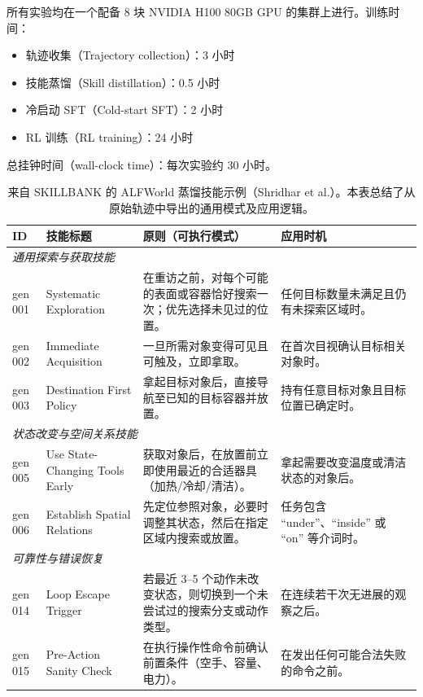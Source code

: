 \documentclass[11pt,UTF8,fontset=fandol]{ctexart}
\begin{document}
所有实验均在一个配备 8 块 NVIDIA H100 80GB GPU 的集群上进行。训练时间：
\begin{itemize}[leftmargin=2em]
\item 轨迹收集（Trajectory collection）：3 小时
\item 技能蒸馏（Skill distillation）：0.5 小时
\item 冷启动 SFT（Cold-start SFT）：2 小时
\item RL 训练（RL training）：24 小时
\end{itemize}
总挂钟时间（wall-clock time）：每次实验约 30 小时。

\begin{table}[H]\centering
\caption{来自 SKILLBANK 的 ALFWorld 蒸馏技能示例（Shridhar et al.）。本表总结了从原始轨迹中导出的通用模式及应用逻辑。}
\label{tab:5}
\small
\renewcommand{\arraystretch}{1.2}
\begin{tabular}{p{1.1cm}p{2.6cm}p{6.2cm}p{4.2cm}}
\toprule
ID & 技能标题 & 原则（可执行模式） & 应用时机 \\
\midrule
\multicolumn{4}{l}{\textit{通用探索与获取技能}} \\
gen 001 & Systematic Exploration & 在重访之前，对每个可能的表面或容器恰好搜索一次；优先选择未见过的位置。 & 任何目标数量未满足且仍有未探索区域时。 \\
gen 002 & Immediate Acquisition & 一旦所需对象变得可见且可触及，立即拿取。 & 在首次目视确认目标相关对象时。 \\
gen 003 & Destination First Policy & 拿起目标对象后，直接导航至已知的目标容器并放置。 & 持有任意目标对象且目标位置已确定时。 \\
\multicolumn{4}{l}{\textit{状态改变与空间关系技能}} \\
gen 005 & Use State-Changing Tools Early & 获取对象后，在放置前立即使用最近的合适器具（加热/冷却/清洁）。 & 拿起需要改变温度或清洁状态的对象后。 \\
gen 006 & Establish Spatial Relations & 先定位参照对象，必要时调整其状态，然后在指定区域内搜索或放置。 & 任务包含 ``under''、``inside'' 或 ``on'' 等介词时。 \\
\multicolumn{4}{l}{\textit{可靠性与错误恢复}} \\
gen 014 & Loop Escape Trigger & 若最近 3--5 个动作未改变状态，则切换到一个未尝试过的搜索分支或动作类型。 & 在连续若干次无进展的观察之后。 \\
gen 015 & Pre-Action Sanity Check & 在执行操作性命令前确认前置条件（空手、容量、电力）。 & 在发出任何可能合法失败的命令之前。 \\
\bottomrule
\end{tabular}
\end{table}
\end{document}
